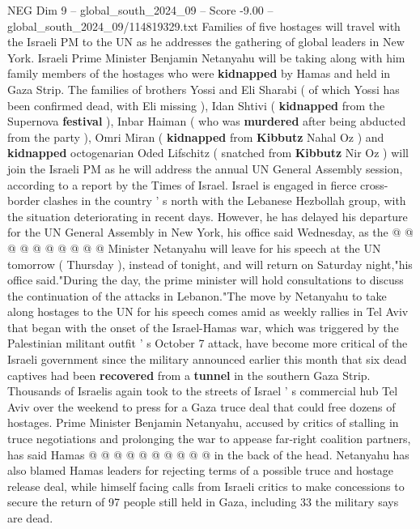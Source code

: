 \begin{textsample}{NEG Dim 9 – global\_south\_2024\_09 – Score -9.00 – global\_south\_2024\_09/114819329.txt}  \label{ex:f9_neg_103}
Families of five hostages will travel with the Israeli PM to the UN as he addresses the gathering of global leaders in New York.
Israeli Prime Minister Benjamin Netanyahu will be taking along with him family members of the hostages who were \textbf{kidnapped} by Hamas and held in Gaza Strip.
The families of brothers Yossi and Eli Sharabi ( of which Yossi has been confirmed dead, with Eli missing ), Idan Shtivi ( \textbf{kidnapped} from the Supernova \textbf{festival} ), Inbar Haiman ( who was \textbf{murdered} after being abducted from the party ), Omri Miran ( \textbf{kidnapped} from \textbf{Kibbutz} Nahal Oz ) and \textbf{kidnapped} octogenarian Oded Lifschitz ( snatched from \textbf{Kibbutz} Nir Oz ) will join the Israeli PM as he will address the annual UN General Assembly session, according to a report by the Times of Israel.
Israel is engaged in fierce cross-border clashes in the country ' s north with the Lebanese Hezbollah group, with the situation deteriorating in recent days.
However, he has delayed his departure for the UN General Assembly in New York, his office said Wednesday, as the @ @ @ @ @ @ @ @ @ @ Minister Netanyahu will leave for his speech at the UN tomorrow ( Thursday ), instead of tonight, and will return on Saturday night,"his office said."During the day, the prime minister will hold consultations to discuss the continuation of the attacks in Lebanon."The move by Netanyahu to take along hostages to the UN for his speech comes amid as weekly rallies in Tel Aviv that began with the onset of the Israel-Hamas war, which was triggered by the Palestinian militant outfit ' s October 7 attack, have become more critical of the Israeli government since the military announced earlier this month that six dead captives had been \textbf{recovered} from a \textbf{tunnel} in the southern Gaza Strip.
Thousands of Israelis again took to the streets of Israel ' s commercial hub Tel Aviv over the weekend to press for a Gaza truce deal that could free dozens of hostages.
Prime Minister Benjamin Netanyahu, accused by critics of stalling in truce negotiations and prolonging the war to appease far-right coalition partners, has said Hamas @ @ @ @ @ @ @ @ @ @ in the back of the head.
Netanyahu has also blamed Hamas leaders for rejecting terms of a possible truce and hostage release deal, while himself facing calls from Israeli critics to make concessions to secure the return of 97 people still held in Gaza, including 33 the military says are dead.

\end{textsample}
